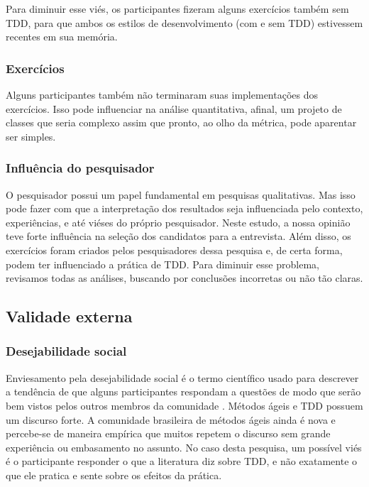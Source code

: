 \documentclass[conference]{IEEEtran}
\begin{document}
Para diminuir esse viés, os participantes fizeram alguns exercícios também
sem TDD, para que ambos os estilos de desenvolvimento (com e sem TDD) estivessem
recentes em sua memória.

\subsubsection{Exercícios}

Alguns participantes também não terminaram suas implementações dos exercícios. Isso
pode influenciar na análise quantitativa, afinal, um projeto de classes que
seria complexo assim que pronto, ao olho da métrica, pode aparentar ser simples.

\subsubsection{Influência do pesquisador}

O pesquisador possui
um papel fundamental em pesquisas qualitativas. Mas isso pode fazer com que
a interpretação dos resultados seja influenciada pelo contexto, experiências,
e até viéses do próprio pesquisador.
Neste estudo, a nossa opinião teve forte influência na seleção dos candidatos
para a entrevista.
Além disso, os exercícios foram criados pelos pesquisadores dessa pesquisa e, 
de certa forma, podem ter influenciado a prática de TDD.
Para diminuir esse problema, revisamos todas as análises,
buscando por conclusões incorretas ou não tão claras. 

\subsection{Validade externa}

\subsubsection{Desejabilidade social}

Enviesamento pela desejabilidade social é o termo científico usado para descrever
a tendência de que alguns participantes respondam a questões de modo que serão
bem vistos pelos outros membros da comunidade \cite{crowne}.
Métodos ágeis e TDD possuem um discurso forte. A comunidade brasileira de métodos
ágeis ainda é nova e percebe-se de maneira empírica que muitos repetem o discurso
sem grande experiência ou embasamento no assunto.
No caso desta pesquisa, um possível viés é o participante responder o que
a literatura diz sobre TDD, e não exatamente o que ele pratica e sente sobre
os efeitos da prática. 
\end{document}
